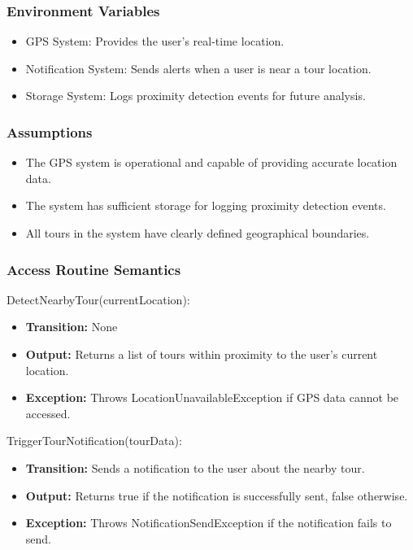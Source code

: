 \documentclass[12pt, titlepage]{article}
\begin{document}
\subsubsection{Environment Variables}

\begin{itemize}
  \item GPS System: Provides the user's real-time location.
  \item Notification System: Sends alerts when a user is near a tour location.
  \item Storage System: Logs proximity detection events for future analysis.
\end{itemize}

\subsubsection{Assumptions}

\begin{itemize}
  \item The GPS system is operational and capable of providing accurate location data.
  \item The system has sufficient storage for logging proximity detection events.
  \item All tours in the system have clearly defined geographical boundaries.
\end{itemize}

\subsubsection{Access Routine Semantics}

\noindent DetectNearbyTour(currentLocation):
\begin{itemize}
  \item \textbf{Transition:} None
  \item \textbf{Output:} Returns a list of tours within proximity to the user's current location.
  \item \textbf{Exception:} Throws LocationUnavailableException if GPS data cannot be accessed.
\end{itemize}

\noindent TriggerTourNotification(tourData):
\begin{itemize}
  \item \textbf{Transition:} Sends a notification to the user about the nearby tour.
  \item \textbf{Output:} Returns true if the notification is successfully sent, false otherwise.
  \item \textbf{Exception:} Throws NotificationSendException if the notification fails to send.
\end{itemize}
\end{document}
